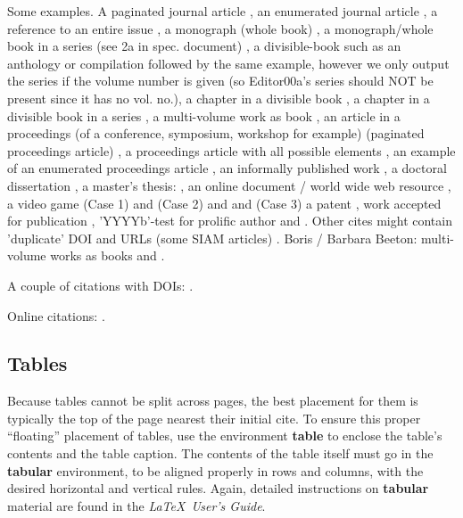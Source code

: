 Some examples.  A paginated journal article \cite{Abril07}, an enumerated
journal article \cite{Cohen07}, a reference to an entire issue \cite{JCohen96},
a monograph (whole book) \cite{Kosiur01}, a monograph/whole book in a series (see 2a in spec. document)
\cite{Harel79}, a divisible-book such as an anthology or compilation \cite{Editor00}
followed by the same example, however we only output the series if the volume number is given
\cite{Editor00a} (so Editor00a's series should NOT be present since it has no vol. no.),
a chapter in a divisible book \cite{Spector90}, a chapter in a divisible book
in a series \cite{Douglass98}, a multi-volume work as book \cite{Knuth97},
an article in a proceedings (of a conference, symposium, workshop for example)
(paginated proceedings article) \cite{Andler79}, a proceedings article
with all possible elements \cite{Smith10}, an example of an enumerated
proceedings article \cite{VanGundy07},
an informally published work \cite{Harel78}, a doctoral dissertation \cite{Clarkson85},
a master's thesis: \cite{anisi03}, an online document / world wide web
resource \cite{Thornburg01, Ablamowicz07, Poker06}, a video game (Case 1) \cite{Obama08} and (Case 2) \cite{Novak03}
and \cite{Lee05} and (Case 3) a patent \cite{JoeScientist001},
work accepted for publication \cite{rous08}, 'YYYYb'-test for prolific author
\cite{SaeediMEJ10} and \cite{SaeediJETC10}. Other cites might contain
'duplicate' DOI and URLs (some SIAM articles) \cite{Kirschmer:2010:AEI:1958016.1958018}.
Boris / Barbara Beeton: multi-volume works as books
\cite{MR781536} and \cite{MR781537}.

A couple of citations with DOIs: \cite{2004:ITE:1009386.1010128,
  Kirschmer:2010:AEI:1958016.1958018}.

Online citations: \cite{TUGInstmem, Thornburg01, CTANacmart}.


\subsection{Tables}
Because tables cannot be split across pages, the best
placement for them is typically the top of the page
nearest their initial cite.  To
ensure this proper ``floating'' placement of tables, use the
environment \textbf{table} to enclose the table's contents and
the table caption.  The contents of the table itself must go
in the \textbf{tabular} environment, to
be aligned properly in rows and columns, with the desired
horizontal and vertical rules.  Again, detailed instructions
on \textbf{tabular} material
are found in the \textit{\LaTeX\ User's Guide}.

